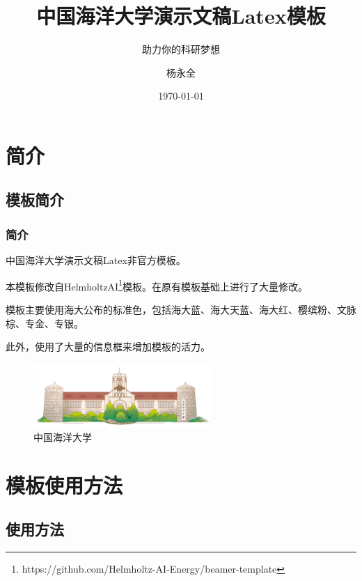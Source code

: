 \documentclass[aspectratio=169,UTF8,t]{beamer}%
\title{中国海洋大学演示文稿Latex模板}
\subtitle{助力你的科研梦想}
\author{杨永全}
\date{\today}
\institute{计算机科学与技术学院}
\begin{document}
\maketitle




\makeoutline

\section{简介}

\subsection{模板简介}

\begin{frame}
    \frametitle{简介}
    中国海洋大学演示文稿Latex非官方模板。

    本模板修改自HelmholtzAI\footnote{https://github.com/Helmholtz-AI-Energy/beamer-template}模板。在原有模板基础上进行了大量修改。

    模板主要使用海大公布的标准色，包括海大蓝、海大天蓝、海大红、樱缤粉、文脉棕、专金、专银。

    此外，使用了大量的信息框来增加模板的活力。
    \begin{center}
        \begin{figure}
        \centering
        \includegraphics[width=0.6\textwidth]{figs/ouc.png}
            \caption{中国海洋大学}
            \label{fig:ouc}
        \end{figure}
    \end{center}
    
    
\end{frame}

\section{模板使用方法}

\subsection{使用方法}
\end{document}
